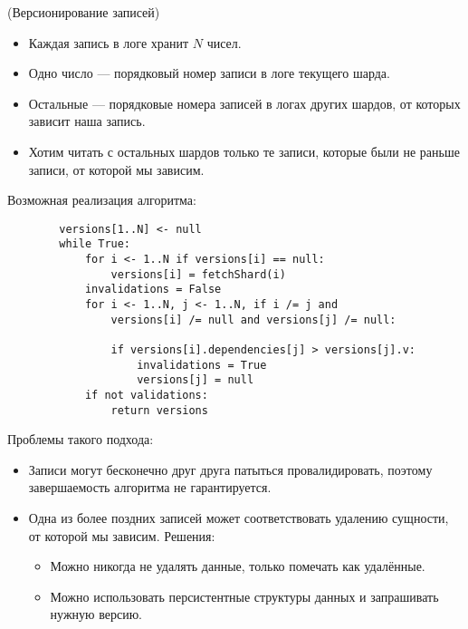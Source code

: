 \begin{algorithm}(Версионирование записей)
    \begin{itemize}
        \item Каждая запись в логе хранит $N$ чисел.
        \item Одно число --- порядковый номер записи в логе текущего шарда.
        \item Остальные --- порядковые номера записей в логах других шардов, от которых зависит наша запись.
        \item Хотим читать с остальных шардов только те записи, которые были не раньше записи, от которой мы зависим.
    \end{itemize}

    Возможная реализация алгоритма:
    \begin{lstlisting}
        versions[1..N] <- null
        while True:
            for i <- 1..N if versions[i] == null:
                versions[i] = fetchShard(i)
            invalidations = False
            for i <- 1..N, j <- 1..N, if i /= j and
                versions[i] /= null and versions[j] /= null:

                if versions[i].dependencies[j] > versions[j].v:
                    invalidations = True
                    versions[j] = null
            if not validations:
                return versions
    \end{lstlisting}

    Проблемы такого подхода:
    \begin{itemize}
        \item Записи могут бесконечно друг друга патыться провалидировать, поэтому завершаемость алгоритма не гарантируется.
        \item Одна из более поздних записей может соответствовать удалению сущности, от которой мы зависим. Решения:
        \begin{itemize}
            \item Можно никогда не удалять данные, только помечать как удалённые.
            \item Можно использовать персистентные структуры данных и запрашивать нужную версию.
        \end{itemize}
    \end{itemize}
\end{algorithm}
